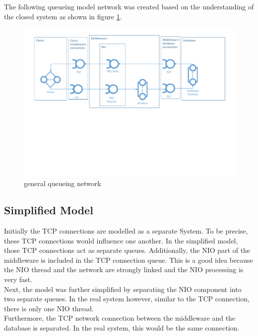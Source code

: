 \documentclass[a4paper]{article}
\begin{document}
The following queueing model network was created based on the understanding of the closed system as shown in figure \ref{fig:general-queueing-network}.

\begin{figure}[H]
	\begin{center}
    \includegraphics[scale=0.6, trim = 15mm 94mm 12mm 10mm, clip]{../drawings-ms2le/general-queueing-network.pdf}
  \end{center}
  \caption{general queueing network}
  \label{fig:general-queueing-network}
\end{figure}


\subsection{Simplified Model}

\noindent Initially the TCP connections are modelled as a separate System. To be precise, these TCP connections would influence one another. In the simplified model, those TCP connections act as separate queues. Additionally, the NIO part of the middleware is included in the TCP connection queue. This is a good idea because the NIO thread and the network are strongly linked and the NIO processing is very fast.\\

\noindent Next, the model was further simplified by separating the NIO component into two separate queues. In the real system however, similar to the TCP connection, there is only one NIO thread.\\

\noindent Furthermore, the TCP network connection between the middleware and the database is separated. In the real system, this would be the same connection.\\
\end{document}
